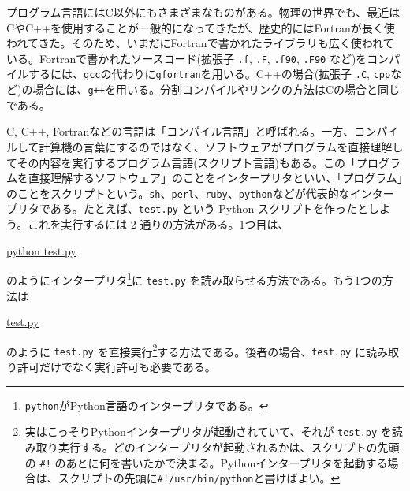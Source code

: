 プログラム言語にはC以外にもさまざまなものがある。物理の世界でも、最近はCやC++を使用することが一般的になってきたが、歴史的にはFortranが長く使われてきた。そのため、いまだにFortranで書かれたライブラリも広く使われている。Fortranで書かれたソースコード(拡張子 {\tt .f}, {\tt .F}, {\tt .f90}, {\tt .F90} など)をコンパイルするには、{\tt gcc}の代わりに{\tt gfortran}を用いる。C++の場合(拡張子 {\tt .C}, {\tt cpp}など)の場合には、{\tt g++}を用いる。分割コンパイルやリンクの方法はCの場合と同じである。

C, C++, Fortranなどの言語は「コンパイル言語」と呼ばれる。一方、コンパイルして計算機の言葉にするのではなく、ソフトウェアがプログラムを直接理解してその内容を実行するプログラム言語(スクリプト言語)もある。この「プログラムを直接理解するソフトウェア」のことをインタープリタといい、「プログラム」のことをスクリプトという。{\tt sh}、{\tt perl}、{\tt ruby}、{\tt python}などが代表的なインタープリタである。たとえば、{\tt test.py} という Python スクリプトを作ったとしよう。これを実行するには 2 通りの方法がある。1つ目は、
\begin{commandline2}
\prompt \underline{python test.py}
\end{commandline2} \noindent
のようにインタープリタ\footnote{{\tt python}がPython言語のインタープリタである。}に {\tt test.py} を読み取らせる方法である。もう1つの方法は
\begin{commandline2}
\prompt \underline{test.py}
\end{commandline2} \noindent
のように {\tt test.py} を直接実行\footnote{実はこっそりPythonインタープリタが起動されていて、それが {\tt test.py} を読み取り実行する。どのインタープリタが起動されるかは、スクリプトの先頭の {\tt \#!} のあとに何を書いたかで決まる。Pythonインタープリタを起動する場合は、スクリプトの先頭に{\tt \#!/usr/bin/python}と書けばよい。}する方法である。後者の場合、{\tt test.py} に読み取り許可だけでなく実行許可も必要である。

